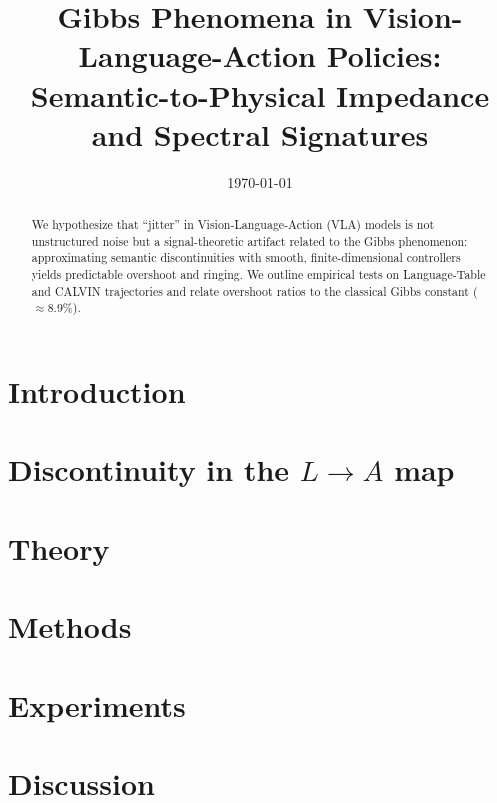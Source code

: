 \documentclass[11pt]{article}
\title{Gibbs Phenomena in Vision-Language-Action Policies:\\
Semantic-to-Physical Impedance and Spectral Signatures}
\author{}
\date{\today}
\begin{document}
\maketitle

\begin{abstract}
We hypothesize that ``jitter'' in Vision-Language-Action (VLA) models is not unstructured noise but a signal-theoretic artifact related to the Gibbs phenomenon: approximating semantic discontinuities with smooth, finite-dimensional controllers yields predictable overshoot and ringing. We outline empirical tests on Language-Table and CALVIN trajectories and relate overshoot ratios to the classical Gibbs constant ($\approx 8.9\%$).
\end{abstract}

\section{Introduction}

\section{Discontinuity in the $L \to A$ map}

\section{Theory}

\section{Methods}

\section{Experiments}

\section{Discussion}

\nocite{*}


\end{document}
